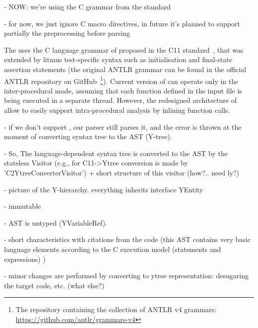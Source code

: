 - NOW: we're using the C grammar from the standard

- for now, we just ignore C macro directives, in future it's planned to support partially the preprocessing before parsing

The \porthos[2] uses the C language grammar of proposed in the C11 standard~\cite{jtc2011sc22}, that was extended by litmus test-specific syntax such as initialisation and final-state assertion statements (the original ANTLR grammar can be found in the official ANTLR repository on GitHub~\footnote{The repository containing the collection of ANTLR v4 grammars:\\ \url{https://github.com/antlr/grammars-v4}}).
Current version of \porthos[2] can operate only in the inter-procedural mode, assuming that each function defined in the input file is being executed in a separate thread.
However, the redesigned architecture of \porthos[2] allow to easily support intra-procedural analysis by inlining function calls.


- if we don't support , our parser still parses it, and the error is thrown at the moment of converting syntax tree to the AST (Y-tree).

- So, The language-dependent syntax tree is converted to the AST by the stateless Visitor (e.g., for C11->Ytree conversion is made by 'C2YtreeConverterVisitor') + short structure of this visitor (how?.. need ly?)



- picture of the Y-hierarchy. everything inherits interface YEntity

- immutable

- AST is untyped (YVariableRef).

- short characteristics with citations from the code (this AST contains very basic language elements according to the C execution model (statements and expressions) )

- minor changes are performed by converting to ytree representation: desugaring the target code, etc. (what else?)



